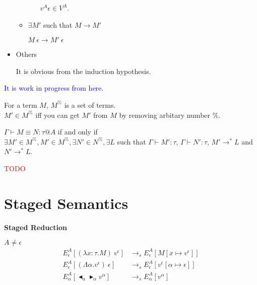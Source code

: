 \documentclass[9pt, a4paper]{extarticle}
\theoremstyle{break}
\newcommand{\figheader}[2]{
  \begin{flushleft}
    #2 {\bf \normalsize #1}
\end{flushleft}}
\newcommand{\G}{\Gamma}
\newcommand{\V}{\vdash}
\newcommand{\TB}{\blacktriangleright}
\newcommand{\TBL}{\blacktriangleleft}
\newcommand{\E}{\equiv}
\newcommand{\red}[1]{\textcolor{red}{ #1 }}
\newcommand{\blue}[1]{\textcolor{blue}{ #1 }}
\begin{document}
\begin{itemize}
\begin{itemize}
\begin{itemize}
                        $v^A \epsilon \in V^A$.
                \end{itemize}
                    
            \item $\exists M'$ such that $M \longrightarrow M'$
            
                $M\ \epsilon \longrightarrow M'\ \epsilon$
        \end{itemize}

    \item Others
    
        It is obvious from the induction hypothesis.

\end{itemize}

\blue{\huge{It is work in progress from here.}}

\begin{dfn}
    For a term $M$, $M^\%$ is a set of terms.\\
    $M' \in M^\%$ iff you can get $M'$ from $M$ by removing arbitary number $\%$.
\end{dfn}

\begin{thm}
    $\G \V M \E N : \tau @A$ if and only if\\
    $\exists M' \in M^\%, M' \in M^\%, \exists N' \in N^\%, \exists L$
    such that $\G \V M' : \tau$, $\G \V N' : \tau$, $M' \longrightarrow^* L$ and $N' \longrightarrow^* L$.
\end{thm}

\red{TODO}

\section{ Staged Semantics }

\figheader{Staged Reduction}{}
$A \neq \epsilon$\\
\begin{align*}
    E^A_\epsilon [(\lambda x:\tau.M)\ v^\epsilon] & \longrightarrow_s E^A_\epsilon[M[x\mapsto v^\epsilon]] \\
    E^A_\epsilon [(\Lambda\alpha.v^\epsilon)\ \epsilon] & \longrightarrow_s E^A_\epsilon[v^\epsilon[\alpha\mapsto \epsilon]] \\
    E^A_\alpha [\TBL_\alpha \TB_\alpha v^\alpha] & \longrightarrow_s E^A_\alpha[v^\alpha] \\
\end{align*}
\end{document}
